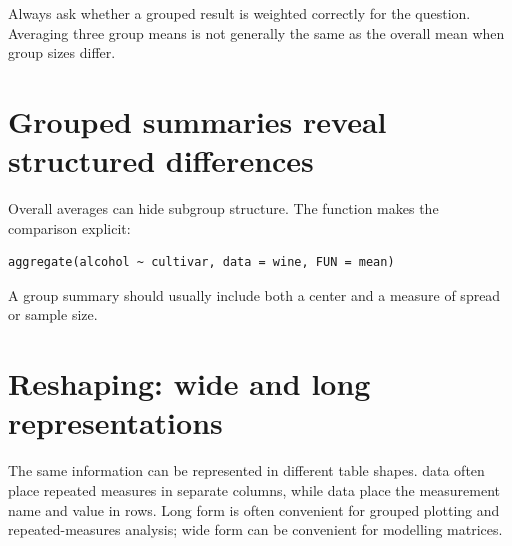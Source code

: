 \begin{keyidea}
Always ask whether a grouped result is weighted correctly for the question. Averaging three group means is not generally the same as the overall mean when group sizes differ.
\end{keyidea}

\section{Grouped summaries reveal structured differences}
Overall averages can hide subgroup structure. The  function makes the comparison explicit:
\begin{lstlisting}[style=utpr]
aggregate(alcohol ~ cultivar, data = wine, FUN = mean)
\end{lstlisting}
A group summary should usually include both a center and a measure of spread or sample size.


\section{Reshaping: wide and long representations}
The same information can be represented in different table shapes.  data often place repeated measures in separate columns, while  data place the measurement name and value in rows. Long form is often convenient for grouped plotting and repeated-measures analysis; wide form can be convenient for modelling matrices.

